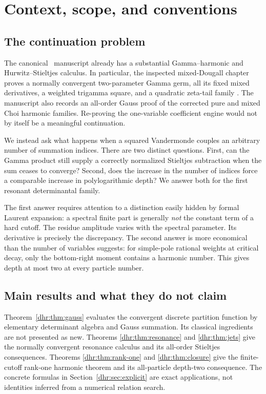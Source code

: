 \section{Context, scope, and conventions}
\label{dhr:sec:context}

\subsection{The continuation problem}
The canonical \repo\ manuscript already has a substantial Gamma--harmonic
and Hurwitz--Stieltjes calculus. In particular, the inspected mixed-Dougall
chapter proves a normally convergent two-parameter Gamma germ, all its
fixed mixed derivatives, a weighted trigamma square, and a quadratic
zeta-tail family \cite{repo:readme,repo:dougall}. The manuscript also records
an all-order Gauss proof of the corrected pure and mixed Choi harmonic
families. Re-proving the one-variable coefficient engine would not by
itself be a meaningful continuation.

We instead ask what happens when a squared Vandermonde couples an arbitrary
number of summation indices. There are two distinct questions. First,
can the Gamma product still supply a correctly normalized Stieltjes
subtraction when the sum ceases to converge? Second, does the increase
in the number of indices force a comparable increase in polylogarithmic
depth? We answer both for the first resonant determinantal family.

The first answer requires attention to a distinction easily hidden by
formal Laurent expansion: a spectral finite part is generally \emph{not}
the constant term of a hard cutoff. The residue amplitude varies with
the spectral parameter. Its derivative is precisely the discrepancy.
The second answer is more economical than the number of variables
suggests: for simple-pole rational weights at critical decay, only the
bottom-right moment contains a harmonic number. This gives depth at most
two at every particle number.

\subsection{Main results and what they do not claim}
Theorem~\ref{dhr:thm:gauss} evaluates the convergent discrete partition
function by elementary determinant algebra and Gauss summation. Its
classical ingredients are not presented as new. Theorems
\ref{dhr:thm:resonance} and \ref{dhr:thm:jets} give the normally convergent
resonance calculus and its all-order Stieltjes consequences. Theorems
\ref{dhr:thm:rank-one} and \ref{dhr:thm:closure} give the finite-cutoff
rank-one harmonic theorem and its all-particle depth-two consequence.
The concrete formulas in Section~\ref{dhr:sec:explicit} are exact
applications, not identities inferred from a numerical relation search.

